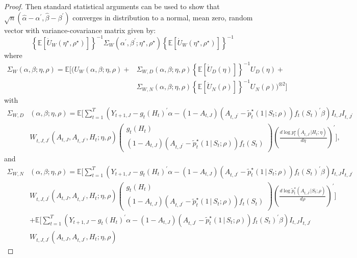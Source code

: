 \documentclass[12pt]{article}
\def\E{\mathbb{E}}
\def\given{\, | \,}
\begin{document}
\begin{proof}
Then standard statistical arguments can be used to show that $\sqrt{n}(\hat\alpha-\alpha^\prime, \hat\beta-\beta^\prime)$ converges in distribution to a normal, mean zero, random vector with variance-covariance matrix given by:
\begin{equation*}
    \left\{ \E \left[\dot U_W(\eta^\star, \rho^\star) \right]\right\}^{-1} \Sigma_W(\alpha^\prime,\beta^\prime;\eta^\star, \rho^\star) \left\{ \E \left[\dot U_W(\eta^\star, \rho^\star) \right]\right\}^{-1}
\end{equation*}
where
\begin{align*}
    \Sigma_W(\alpha,\beta;\eta, \rho) = \E \Big[\Big(U_W(\alpha,\beta;\eta, \rho) + &\Sigma_{W,D}(\alpha,\beta;\eta, \rho) \left\{\E[\dot U_D(\eta)] \right\}^{-1} U_D(\eta) + \nonumber \\ &\Sigma_{W,N}(\alpha,\beta;\eta, \rho)\left\{\E[\dot U_N(\rho)] \right\}^{-1} U_N(\rho) \Big)^ {\otimes 2} \Big]
\end{align*}
with
\begin{align*}
    \Sigma_{W,D}&(\alpha,\beta ; \eta, \rho)
    = \E \Big[ \sum_{t=1}^T \left( Y_{t+1,J} - g_t(H_t)^\prime \alpha -  (1-A_{t,J})(A_{t,J^\prime} - \tilde p_t^\star (1 \given S_t;\rho) ) f_t (S_t)^\prime \beta \right)I_{t,J}I_{t,J^\prime} \nonumber \\ &W_{t,J, J^\prime}(A_{t,J},A_{t,J^\prime},H_t; \eta,\rho)
    \begin{pmatrix}
  g_t(H_t) \\
  (1-A_{t,J})(A_{t,J^\prime} - \tilde {p}^\star_t (1 \given S_t;\rho) ) f_t (S_t)
\end{pmatrix}\left(\frac{d \log p^\star_t(A_{t,J^\prime}|H_t;\eta)}{d \eta} \right)^\prime \Big],
\end{align*}
and
\begin{align*}
    \Sigma_{W,N}&(\alpha,\beta;\eta, \rho)
    = \E \Big[ \sum_{t=1}^T \left( Y_{t+1,J} - g_t(H_t)^\prime \alpha -  (1-A_{t,J})(A_{t,J^\prime} - \tilde p_t^\star (1 \given S_t;\rho) ) f_t (S_t)^\prime \beta \right)I_{t,J}I_{t,J^\prime} \nonumber \\ &W_{t,J, J^\prime}(A_{t,J},A_{t,J^\prime},H_t; \eta,\rho)
    \begin{pmatrix}
  g_t(H_t) \\
  (1-A_{t,J})(A_{t,J^\prime} - \tilde {p}^\star_t (1 \given S_t;\rho) ) f_t (S_t)
\end{pmatrix}\left(\frac{d \log \tilde p^\star_t(A_{t,J^\prime}|S_t;\rho)}{d \rho} \right)^\prime \Big] \nonumber \\
&+\E \Big[ \sum_{t=1}^T \left( Y_{t+1,J} - g_t(H_t)^\prime \alpha -  (1-A_{t,J})(A_{t,J^\prime} - \tilde p_t^\star (1 \given S_t;\rho) ) f_t (S_t)^\prime \beta \right)I_{t,J}I_{t,J^\prime} \nonumber \\ &W_{t,J, J^\prime}(A_{t,J},A_{t,J^\prime},H_t; \eta,\rho)

\end{align*}
\end{proof}
\end{document}
